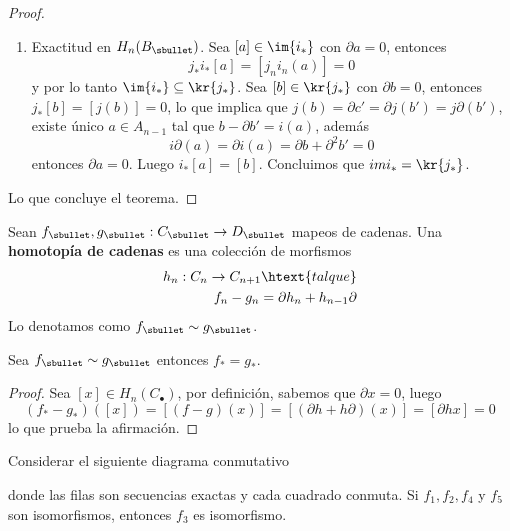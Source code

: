 \documentclass{article}
\begin{document}
\begin{proof}
\begin{enumerate}
        \item Exactitud en $H_{n}(B_{\sbullet})$. Sea $[a]\in\im{i_{*}}$ con $\partial a=0$, 
        entonces
        \begin{equation*}
            j_{*}i_{*}[a]=[j_{n}i_{n}(a)]=0
        \end{equation*}
        y por lo tanto $\im{i_{*}}\subseteq\kr{j_{*}}$. Sea $[b]\in\kr{j_{*}}$ con 
        $\partial b=0$, entonces $j_{*}[b]=[j(b)]=0$, lo que implica que $j(b)=\partial c'
        =\partial j(b')=j\partial(b')$, existe único $a\in A_{n-1}$ tal que $b-\partial b'=i(a)$,
        además
        \begin{equation*}
            i\partial(a)=\partial i(a)=\partial b+\partial^{2}b'=0
        \end{equation*}
        entonces $\partial a=0$. Luego $i_{*}[a]=[b]$. Concluimos que $im{i_{*}}=\kr{j_{*}}$.
    \end{enumerate}
    Lo que concluye el teorema.
\end{proof}

\begin{dfn}
    Sean $f_{\sbullet},g_{\sbullet}:C_{\sbullet}\to D_{\sbullet}$ mapeos de cadenas. Una 
    \textbf{homotopía de cadenas} es una colección de morfismos
    \begin{align*}
        h_{n}:C_{n}\to C_{n+1}\htext{tal que} \\
        f_{n}-g_{n}=\partial h_{n}+h_{n-1}\partial
    \end{align*}
    Lo denotamos como $f_{\sbullet}\sim g_{\sbullet}$.
\end{dfn}

\begin{prop}
    Sea $f_{\sbullet}\sim g_{\sbullet}$ entonces $f_{*}=g_{*}$.
\end{prop}
\begin{proof}
    Sea $[x]\in H_{n}(C_{\bullet})$, por definición, sabemos que $\partial x=0$, luego
    \begin{equation*}
        (f_{*}-g_{*})([x])=[(f-g)(x)]=[(\partial h+h\partial)(x)]=[\partial hx]=0
    \end{equation*}
    lo que prueba la afirmación.
\end{proof}

\begin{prop}
    Considerar el siguiente diagrama conmutativo
    
    \vspace{2mm}
    \centerline{
    }

    \vspace{2mm}
    \noindent donde las filas son secuencias exactas y cada cuadrado conmuta. Si 
    $f_{1},f_{2},f_{4}$ y $f_{5}$ son isomorfismos, entonces $f_{3}$ es isomorfismo.
\end{prop}
\end{document}
